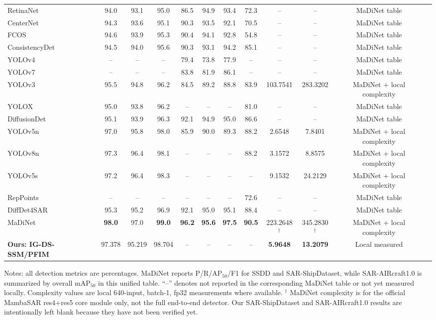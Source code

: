 \documentclass[10pt]{article}
\newcommand{\na}{--}
\newcommand{\ours}{\textbf{Ours: IG-DS-SSM/PFIM}}
\begin{document}
\begin{landscape}
\begin{table}
\begin{threeparttable}
\begin{tabular}{lccccccccccc}
RetinaNet & 94.0 & 93.1 & 95.0 & 86.5 & 94.9 & 93.4 & 72.3 & \na & \na & MaDiNet table \\
CenterNet & 94.3 & 93.6 & 95.1 & 90.3 & 93.5 & 92.1 & 70.5 & \na & \na & MaDiNet table \\
FCOS & 94.6 & 93.9 & 95.3 & 90.4 & 94.1 & 92.8 & 54.8 & \na & \na & MaDiNet table \\
ConsistencyDet & 94.5 & 94.0 & 95.6 & 90.3 & 93.1 & 94.2 & 85.1 & \na & \na & MaDiNet table \\
YOLOv4 & \na & \na & \na & 79.4 & 73.8 & 77.9 & \na & \na & \na & MaDiNet table \\
YOLOv7 & \na & \na & \na & 83.8 & 81.9 & 86.1 & \na & \na & \na & MaDiNet table \\
YOLOv3 & 95.5 & 94.8 & 96.2 & 84.5 & 89.2 & 88.8 & 83.9 & 103.7541 & 283.3202 & MaDiNet + local complexity \\
YOLOX & 95.0 & 93.8 & 96.2 & \na & \na & \na & 81.0 & \na & \na & MaDiNet table \\
DiffusionDet & 95.1 & 93.9 & 96.3 & 92.1 & 94.9 & 95.0 & 86.6 & \na & \na & MaDiNet table \\
YOLOv5n & 97.0 & 95.8 & 98.0 & 85.9 & 90.0 & 89.3 & 88.2 & 2.6548 & 7.8401 & MaDiNet + local complexity \\
YOLOv8n & 97.3 & 96.4 & 98.1 & \na & \na & \na & 88.2 & 3.1572 & 8.8575 & MaDiNet + local complexity \\
YOLOv5s & 97.2 & 96.4 & 98.3 & \na & \na & \na & \na & 9.1532 & 24.2129 & MaDiNet + local complexity \\
RepPoints & \na & \na & \na & \na & \na & \na & 72.6 & \na & \na & MaDiNet table \\
DiffDet4SAR & 95.3 & 95.2 & 96.9 & 92.1 & 95.0 & 95.1 & 88.4 & \na & \na & MaDiNet table \\
MaDiNet & \textbf{98.0} & 97.0 & \textbf{99.0} & \textbf{96.2} & \textbf{95.6} & \textbf{97.5} & \textbf{90.5} & 223.2648$^\dagger$ & 345.2830$^\dagger$ & MaDiNet + local complexity \\
\midrule
\rowcolor{gray!12}
\ours & 97.378 & 95.219 & 98.704 & \na & \na & \na & \na & \textbf{5.9648} & \textbf{13.2079} & Local measured \\
\bottomrule
\end{tabular}
\begin{tablenotes}[flushleft]
\footnotesize
\item Notes: all detection metrics are percentages. MaDiNet reports P/R/AP$_{50}$/F1 for SSDD and SAR-ShipDataset, while SAR-AIRcraft1.0 is summarized by overall mAP$_{50}$ in this unified table. ``--'' denotes not reported in the corresponding MaDiNet table or not yet measured locally. Complexity values are local 640-input, batch-1, fp32 measurements where available. $^\dagger$ MaDiNet complexity is for the official MambaSAR res4+res5 core module only, not the full end-to-end detector. Our SAR-ShipDataset and SAR-AIRcraft1.0 results are intentionally left blank because they have not been verified yet.
\end{tablenotes}
\end{threeparttable}
\end{table}
\end{landscape}
\end{document}
